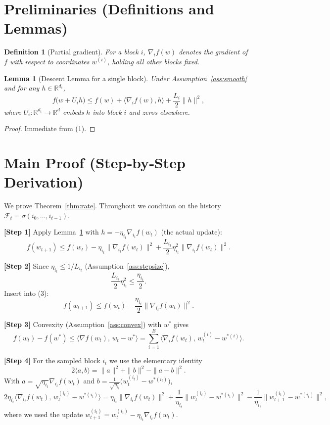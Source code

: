 \documentclass{article}
\newtheorem{lemma}{Lemma}
\newtheorem{definition}{Definition}
\newcommand{\R}{\mathbb{R}}
\begin{document}
\newpage

\section*{Preliminaries (Definitions and Lemmas)}
\begin{definition}[Partial gradient]
For a block $i$, $\nabla_i f(w)$ denotes the gradient of $f$ with respect to
coordinates $w^{(i)}$, holding all other blocks fixed.
\end{definition}

\begin{lemma}[Descent Lemma for a single block]\label{lem:descent}
Under Assumption~\ref{ass:smooth} and for any $h\in\R^{d_i}$,
\[
f\bigl(w+U_i h\bigr)\le f(w)+\langle \nabla_i f(w),h\rangle
+\frac{L_i}{2}\|h\|^{2},
\]
where $U_i:\R^{d_i}\rightarrow\R^{d}$ embeds $h$ into block $i$ and zeros elsewhere.
\end{lemma}
\begin{proof}
Immediate from (1). \qedhere
\end{proof}

\section*{Main Proof (Step‑by‑Step Derivation)}
We prove Theorem~\ref{thm:rate}.  Throughout we condition on the history
$\mathcal{F}_t=\sigma(i_0,\dots ,i_{t-1})$.

\noindent\textbf{[Step 1]}  Apply Lemma~\ref{lem:descent} with
$h=-\eta_{i_t}\nabla_{i_t}f(w_t)$ (the actual update):
\[
f(w_{t+1})\le f(w_t)-\eta_{i_t}\|\nabla_{i_t}f(w_t)\|^{2}
+\frac{L_{i_t}}{2}\eta_{i_t}^{2}\|\nabla_{i_t}f(w_t)\|^{2}.
\tag{3}
\]

\noindent\textbf{[Step 2]}  Since $\eta_{i_t}\le 1/L_{i_t}$ (Assumption~\ref{ass:stepsize}),
\[
\frac{L_{i_t}}{2}\eta_{i_t}^{2}\le \frac{\eta_{i_t}}{2}.
\]
Insert into (3):
\[
f(w_{t+1})\le f(w_t)-\frac{\eta_{i_t}}{2}\|\nabla_{i_t}f(w_t)\|^{2}.
\tag{4}
\]

\noindent\textbf{[Step 3]}  Convexity (Assumption~\ref{ass:convex}) with $w^{*}$
gives
\[
f(w_t)-f(w^{*})\le \langle \nabla f(w_t),\,w_t-w^{*}\rangle
= \sum_{i=1}^{B}\langle \nabla_i f(w_t),\,w_t^{(i)}-w^{*(i)}\rangle .
\tag{5}
\]

\noindent\textbf{[Step 4]}  For the sampled block $i_t$ we use the elementary
identity
\[
2\langle a,b\rangle = \|a\|^{2}+\|b\|^{2}-\|a-b\|^{2}.
\]
With $a=\sqrt{\eta_{i_t}}\nabla_{i_t}f(w_t)$ and
$b=\frac{1}{\sqrt{\eta_{i_t}}}\bigl(w_t^{(i_t)}-w^{*(i_t)}\bigr)$,
\[
2\eta_{i_t}\langle \nabla_{i_t}f(w_t),\,w_t^{(i_t)}-w^{*(i_t)}\rangle
= \eta_{i_t}\|\nabla_{i_t}f(w_t)\|^{2}
+\frac{1}{\eta_{i_t}}\|w_t^{(i_t)}-w^{*(i_t)}\|^{2}
-\frac{1}{\eta_{i_t}}\|w_{t+1}^{(i_t)}-w^{*(i_t)}\|^{2},
\tag{6}
\]
where we used the update $w_{t+1}^{(i_t)}=w_t^{(i_t)}-\eta_{i_t}\nabla_{i_t}f(w_t)$.
\end{document}
